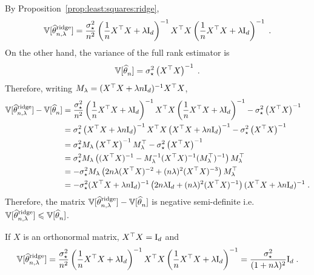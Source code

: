 \begin{remark}
By Proposition~\ref{prop:least:squares:ridge}, 
$$
\mathbb{V}[\widehat {\theta}^{\mathrm{ridge}}_{n,\lambda}]  = \frac{\sigma_\star^{2}}{n^2}\left(\frac{1}{n}X^\top X + \lambda \mathrm{I}_d\right)^{-1}X^\top X  \left(\frac{1}{n}X^\top X + \lambda \mathrm{I}_d\right)^{-1}\;.
$$
On the other hand, the variance of the full rank estimator is 
$$
\mathbb{V}[\widehat {\theta}^{}_{n}]  = \sigma_\star^{2}\left(X^\top X\right)^{-1}\;.
$$
Therefore, writing $M_\lambda = (X^\top X + \lambda n \mathrm{I}_d)^{-1}X^\top X$,
\begin{align*}
\mathbb{V}[\widehat {\theta}^{\mathrm{ridge}}_{n,\lambda}]  - \mathbb{V}[\widehat {\theta}^{}_{n}] & =  \frac{\sigma_\star^{2}}{n^2}\left(\frac{1}{n}X^\top X + \lambda \mathrm{I}_d\right)^{-1}X^\top X  \left(\frac{1}{n}X^\top X + \lambda \mathrm{I}_d\right)^{-1} - \sigma_\star^{2}\left(X^\top X\right)^{-1}\\
&= \sigma_\star^{2}\left(X^\top X + \lambda n \mathrm{I}_d\right)^{-1}X^\top X  \left(X^\top X + \lambda n \mathrm{I}_d\right)^{-1} - \sigma_\star^{2}\left(X^\top X\right)^{-1}\\
&= \sigma_\star^{2}M_\lambda \left(X^\top X\right)^{-1}M_\lambda^\top  - \sigma_\star^{2}\left(X^\top X\right)^{-1}\\
&= \sigma_\star^{2}M_\lambda\left((X^\top X)^{-1}  - M_\lambda^{-1}(X^\top X)^{-1}(M_\lambda^\top)^{-1}\right)M_\lambda^{\top}\\
&= -\sigma_\star^{2}M_\lambda\left(2n\lambda(X^\top X)^{-2} + (n\lambda)^2(X^\top X)^{-3}\right)M_\lambda^{\top}\\
&= -\sigma_\star^{2}(X^\top X + \lambda n \mathrm{I}_d)^{-1}\left(2n\lambda\mathrm{I}_d + (n\lambda)^2(X^\top X)^{-1}\right)(X^\top X + \lambda n \mathrm{I}_d)^{-1}\;.
\end{align*}
Therefore, the matrix $\mathbb{V}[\widehat {\theta}^{\mathrm{ridge}}_{n,\lambda}]  - \mathbb{V}[\widehat {\theta}^{}_{n}]$ is negative semi-definite i.e. $\mathbb{V}[\widehat {\theta}^{\mathrm{ridge}}_{n,\lambda}]\leqslant \mathbb{V}[\widehat {\theta}^{}_{n}]$.
\end{remark}

\begin{remark}
If $X$ is an orthonormal matrix, $X^\top X = \mathrm{I}_d$ and
\begin{equation*}
\mathbb{V}[\widehat {\theta}^{\mathrm{ridge}}_{n,\lambda}]  = \frac{\sigma_\star^{2}}{n^2}\left(\frac{1}{n}X^\top X + \lambda \mathrm{I}_d\right)^{-1}X^\top X  \left(\frac{1}{n}X^\top X + \lambda \mathrm{I}_d\right)^{-1}= \frac{\sigma^2_\star}{(1+n\lambda)^2}\mathrm{I}_d\;.
\end{equation*}
\end{remark}


